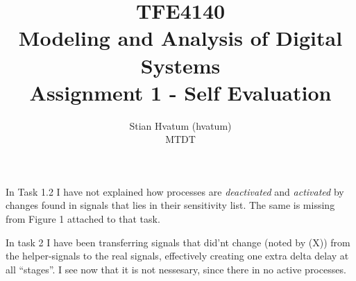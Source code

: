 \documentclass[english,a4paper]{report}
\title{TFE4140\\Modeling and Analysis of Digital Systems\\
\Huge Assignment 1 - Self Evaluation}
\author{Stian Hvatum (hvatum)\\MTDT}
\begin{document}
   \vspace*{-5pt}
       {\let\newpage\relax\maketitle}
In Task 1.2 I have not explained how processes are \textit{deactivated} and \textit{activated} by changes found in signals that lies in their sensitivity list.
The same is missing from Figure 1 attached to that task.

In task 2 I have been transferring signals that did'nt change (noted by (X)) from the helper-signals to the real signals, effectively creating one extra delta delay at all ``stages''.
I see now that it is not nessesary, since there in no active processes.
\end{document}
